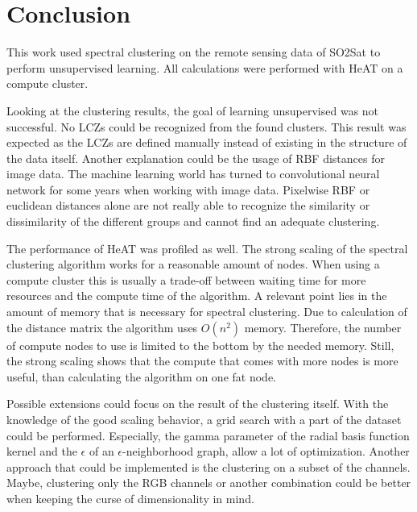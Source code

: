 \section{Conclusion}
\label{sec:conclusion}
This work used spectral clustering on the remote sensing data of SO2Sat to perform unsupervised learning.
All calculations were performed with \gls{HeAT} on a compute cluster.

Looking at the clustering results, the goal of learning unsupervised was not successful.
No \glspl{LCZ} could be recognized from the found clusters.
This result was expected as the \glspl{LCZ}  are defined manually instead of existing in the structure of the data itself.
Another explanation could be the usage of \gls{RBF} distances for image data. The machine learning world has turned to convolutional neural network
for some years when working with image data. Pixelwise \gls{RBF} or euclidean distances alone are not really able to recognize the similarity or dissimilarity
of the different groups and cannot find an adequate clustering.

The performance of \gls{HeAT} was profiled as well.
The strong scaling of the spectral clustering algorithm works for a reasonable amount of nodes.
When using a compute cluster this is usually a trade-off between waiting time for more resources and the compute time of the algorithm.
A relevant point lies in the amount of memory that is necessary for spectral clustering. Due to calculation of the distance matrix
the algorithm uses \(O(n^2)\) memory.
Therefore, the number of compute nodes to use is limited to the bottom by the needed memory.
Still, the strong scaling shows that the compute that comes with more nodes is more useful, than calculating the algorithm on one fat node.

Possible extensions could focus on the result of the clustering itself.
With the knowledge of the good scaling behavior, a grid search with a part of the dataset could be performed.
Especially, the gamma parameter of the radial basis function kernel and the \(\epsilon\) of an \(\epsilon\)-neighborhood graph, allow a lot of optimization.
Another approach that could be implemented is the clustering on a subset of the channels.
Maybe, clustering only the RGB channels or another combination could be better when keeping the curse of dimensionality in mind.

